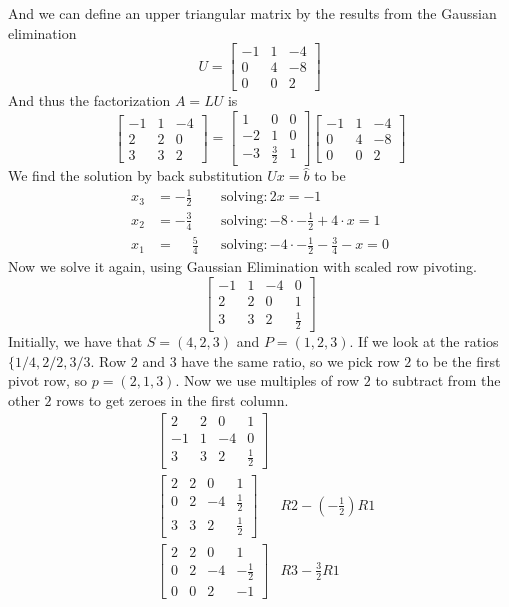 \documentclass[12pt]{article}
\begin{document}
And we can define an upper triangular matrix by the results from the Gaussian elimination
$$
U=
\begin{bmatrix}
-1 & 1 & -4 \\
0 & 4 & -8 \\
0 & 0 & 2
\end{bmatrix}
$$
And thus the factorization $A=LU$ is
$$
\begin{bmatrix}
-1 & 1 & -4 \\
2 & 2 & 0 \\
3 & 3 & 2
\end{bmatrix}
=
\begin{bmatrix}
1 & 0 & 0 \\
-2 & 1 & 0 \\
-3 & \frac{3}{2} & 1
\end{bmatrix}
\begin{bmatrix}
-1 & 1 & -4 \\
0 & 4 & -8 \\
0 & 0 & 2
\end{bmatrix}
$$
We find the solution by back substitution $Ux=\hat{b}$ to be
\begin{align*}
x_3&=-\frac{1}{2}&&\mbox{solving}:2x=-1\\
x_2&=-\frac{3}{4}&&\mbox{solving}:-8\cdot -\frac{1}{2}+4\cdot x=1\\
x_1&=\phantom{-}\frac{5}{4}&&\mbox{solving}:-4\cdot -\frac{1}{2}-\frac{3}{4}-x=0
\end{align*}
Now we solve it again, using Gaussian Elimination with scaled row pivoting.
$$
\begin{bmatrix}
-1 & 1 & -4 & 0\\
2 & 2 & 0 & 1\\
3 & 3 & 2 & \frac{1}{2}
\end{bmatrix}
$$
Initially, we have that $S=(4,2,3)$ and $P=(1,2,3)$. If we look at the ratios $\{1/4,2/2,3/3$. Row $2$ and $3$ have the same ratio, so we pick row $2$ to be the first pivot row, so $p=(2,1,3)$. Now we use multiples of row $2$ to subtract from the other $2$ rows to get zeroes in the first column.
\begin{align*}
&\begin{bmatrix}
2 & 2 & 0 & 1\\
-1 & 1 & -4 & 0\\
3 & 3 & 2 & \frac{1}{2}
\end{bmatrix}\\
&\begin{bmatrix}
2 & 2 & 0 & 1\\
0 & 2 & -4 & \frac{1}{2}\\
3 & 3 & 2 & \frac{1}{2}
\end{bmatrix}
&R2-(-\frac{1}{2})R1 \\
&\begin{bmatrix}
2 & 2 & 0 & 1\\
0 & 2 & -4 & -\frac{1}{2}\\
0 & 0 & 2 & -1
\end{bmatrix}
&R3-\frac{3}{2}R1
\end{align*}
\end{document}
